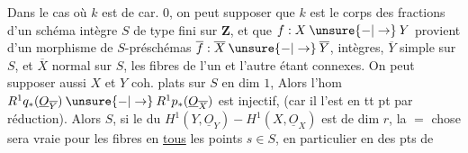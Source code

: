 Dans le cas où $k$ est de car. $0$, on peut supposer que $k$ est
le corps des fractions d'un schéma intègre $S$ de type fini sur $\mathbf Z$,
et que $f:X\mathbin{\unsure{-|\to}}Y$ provient d'un morphisme de
$S$-préschémas $\overline f:\overline X\mathbin{\unsure{-|\to}}\overline Y$,
intègres, $\overline Y$ simple sur $S$, et $\overline X$
 normal sur $S$, les fibres de l'un et l'autre étant
 connexes.
On peut supposer aussi $X$ et $Y$ coh. plats sur $S$ en dim $1$,
Alors 
l'hom
$R^1q_*(\underline O_{\overline Y})\mathbin{\unsure{-|\to}}
R^1p_*(\underline O_{\overline X})$
est injectif, 
(car il l'est en tt pt par réduction).
Alors  $S$, si le 
du $H^1(Y,\underline O_Y)\mathbin{-}H^1(X,\underline O_X)$
est de dim $r$, la $=$ chose sera vraie pour les fibres en \uline{tous}
les points $s\in S$, en particulier en des pts de
